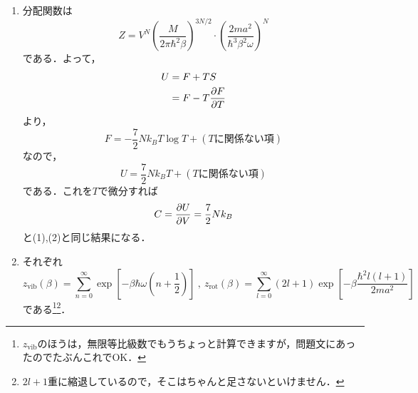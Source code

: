 \documentclass[a4paper,pdflatex,ja=standard]{bxjsarticle}
\begin{document}
\begin{enumerate}
  \item   
  分配関数は
  \begin{equation}
    Z
    =
    V^{N}\left( \frac{M}{2\pi\hbar^2 \beta} \right)^{3N/2}
    \cdot
    \left(  
      \frac{2ma^2}{\hbar^3 \beta^2 \omega}
    \right)^{N}
  \end{equation}
  である．よって，
  \begin{align}
    U
    &=
    F+TS
    \nonumber
    \\
    &=
    F
    -
    T\pdv{F}{T}
  \end{align}
  より，
  \begin{equation}
    F
    =
    -\frac{7}{2}Nk_{B}T\log T
    +
    (\text{$T$に関係ない項})
  \end{equation}
  なので，
  \begin{equation}
    U
    =
    \frac{7}{2}Nk_{B}T
    +
    (\text{$T$に関係ない項})
  \end{equation}
  である．これを$T$で微分すれば
  \begin{equation}
    C
    =
    \pdv{U}{V}
    =
    \frac{7}{2}Nk_{B}
  \end{equation}
  と(1),(2)と同じ結果になる．

  \item 
  それぞれ
  \begin{equation}
    z_{\text{vib}}(\beta)
    =
    \sum_{n=0}^{\infty}\exp\left[ -\beta \hbar\omega\left( n+\frac{1}{2} \right) \right]
    \ ,\ 
    z_{\text{rot}}(\beta)
    =
    \sum_{l=0}^{\infty}(2l+1)\exp\left[ -\beta \frac{\hbar^2 l(l+1)}{2ma^2} \right]
  \end{equation}
  である\footnote{$z_{\text{vib}}$のほうは，無限等比級数でもうちょっと計算できますが，問題文にあったのでたぶんこれでOK．}\footnote{$2l+1$重に縮退しているので，そこはちゃんと足さないといけません．}．


\end{enumerate}
\end{document}
